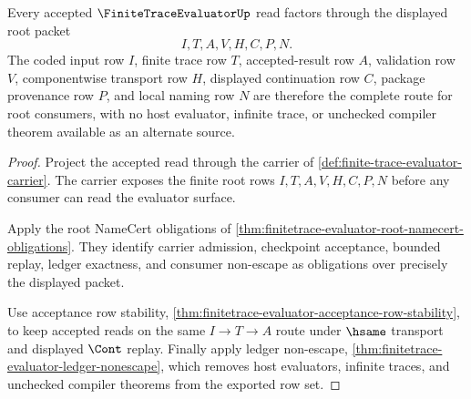 \begin{theorem}
\label{thm:finite-trace-evaluator-route-totality}
Every accepted $\FiniteTraceEvaluatorUp$ read factors through the displayed
root packet
$$
I,T,A,V,H,C,P,N.
$$
The coded input row $I$, finite trace row $T$, accepted-result row $A$,
validation row $V$, componentwise transport row $H$, displayed continuation
row $C$, package provenance row $P$, and local naming row $N$ are therefore the
complete route for root consumers, with no host evaluator, infinite trace, or
unchecked compiler theorem available as an alternate source.
\end{theorem}
\begin{proof}
Project the accepted read through the carrier of
\autoref{def:finite-trace-evaluator-carrier}. The carrier exposes the finite
root rows $I,T,A,V,H,C,P,N$ before any consumer can read the evaluator surface.

Apply the root NameCert obligations of
\autoref{thm:finitetrace-evaluator-root-namecert-obligations}. They identify
carrier admission, checkpoint acceptance, bounded replay, ledger exactness,
and consumer non-escape as obligations over precisely the displayed packet.

Use acceptance row stability,
\autoref{thm:finitetrace-evaluator-acceptance-row-stability}, to keep
accepted reads on the same $I \to T \to A$ route under $\hsame$ transport and
displayed $\Cont$ replay. Finally apply ledger non-escape,
\autoref{thm:finitetrace-evaluator-ledger-nonescape}, which removes host
evaluators, infinite traces, and unchecked compiler theorems from the exported
row set.
\end{proof}

